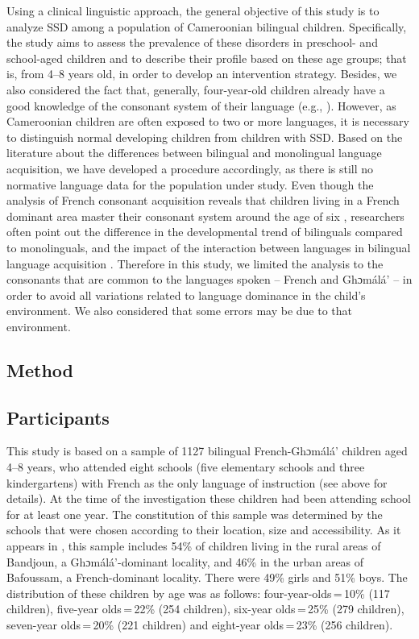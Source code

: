 \documentclass[output=paper,newtxmath,modfonts,nonflat,draftmode]{langsci/langscibook}
\begin{document}
Using a clinical linguistic approach, the general objective of this study is to analyze SSD among a population of Cameroonian bilingual children. Specifically, the study aims to assess the prevalence of these disorders in preschool- and school-aged children and to describe their profile based on these age groups; that is, from 4--8 years old, in order to develop an intervention strategy. Besides, we also considered the fact that, generally, four-year-old children already have a good knowledge of the consonant system of their language (e.g., \citealt{MacLeodEtAl2011}). However, as Cameroonian children are often exposed to two or more languages, it is necessary to distinguish normal developing children from children with SSD. Based on the literature about the differences between bilingual and monolingual language acquisition, we have developed a procedure accordingly, as there is still no normative language data for the population under study. Even though the analysis of French consonant acquisition reveals that children living in a French dominant area master their consonant system around the age of six \cite{Rvachew2013}, researchers often point out the difference in the developmental trend of bilinguals compared to monolinguals, and the impact of the interaction between languages in bilingual language acquisition \cite{Paradis2011}. Therefore in this study, we limited the analysis to the consonants that are common to the languages spoken – French and Ghɔmálá’ – in order to avoid all variations related to language dominance in the child’s environment. We also considered that some errors may be due to that environment. 

\subsection{Method} %

\subsection{Participants}

This study is based on a sample of 1127 bilingual French-Ghɔmálá’ children aged 4--8 years, who attended eight schools (five elementary schools and three kindergartens) with French as the only language of instruction (see  above for details). At the time of the investigation these children had been attending school for at least one year. The constitution of this sample was determined by the schools that were chosen according to their location, size and accessibility. As it appears in , this sample includes 54\% of children living in the rural areas of Bandjoun, a Ghɔmálá’-dominant locality, and 46\% in the urban areas of Bafoussam, a French-dominant locality. There were 49\% girls and 51\% boys. The distribution of these children by age was as follows: four-year-olds\,=\,10\% (117 children), five-year olds\,=\,22\% (254 children), six-year olds\,=\,25\% (279 children), seven-year olds\,=\,20\% (221 children) and eight-year olds\,=\,23\% (256 children).
\end{document}

